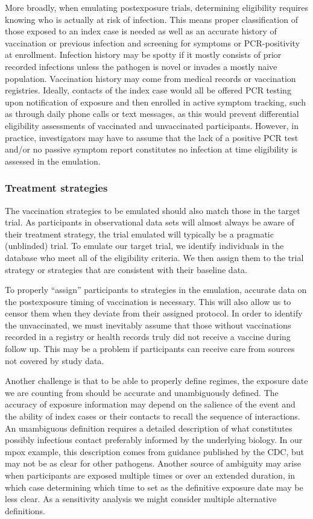 \documentclass[11pt]{article}
\begin{document}
More broadly, when emulating postexposure trials, determining eligibility requires knowing who is actually at risk of infection. This means proper classification of those exposed to an index case is needed as well as an accurate history of vaccination or previous infection and screening for symptoms or PCR-positivity at enrollment. Infection history may be spotty if it mostly consists of prior recorded infections unless the pathogen is novel or invades a mostly naive population. Vaccination history may come from medical records or vaccination registries. Ideally, contacts of the index case would all be offered PCR testing upon notification of exposure and then enrolled in active symptom tracking, such as through daily phone calls or text messages, as this would prevent differential eligibility assessments of vaccinated and unvaccinated participants. However, in practice, investigators may have to assume that the lack of a positive PCR test and/or no passive symptom report constitutes no infection at time eligibility is assessed in the emulation.

\subsubsection*{Treatment strategies}
The vaccination strategies to be emulated should also match those in the target trial. As participants in observational data sets will almost always be aware of their treatment strategy, the trial emulated will typically be a pragmatic (unblinded) trial. To emulate our target trial, we identify individuals in the database who meet all of the eligibility criteria. We then assign them to the trial strategy or strategies that are consistent with their baseline data.

To properly ``assign'' participants to strategies in the emulation, accurate data on the postexposure timing of vaccination is necessary. This will also allow us to censor them when they deviate from their assigned protocol. In order to identify the unvaccinated, we must inevitably assume that those without vaccinations recorded in a registry or health records truly did not receive a vaccine during follow up. This may be a problem if participants can receive care from sources not covered by study data. 

Another challenge is that to be able to properly define regimes, the exposure date we are counting from should be accurate and unambiguously defined. The accuracy of exposure information may depend on the salience of the event and the ability of index cases or their contacts to recall the sequence of interactions. An unambiguous definition requires a detailed description of what constitutes possibly infectious contact preferably informed by the underlying biology. In our mpox example, this description comes from guidance published by the CDC, but may not be as clear for other pathogens. Another source of ambiguity may arise when participants are exposed multiple times or over an extended duration, in which case determining which time to set as the definitive exposure date may be less clear. As a sensitivity analysis we might consider multiple alternative definitions.
\end{document}
